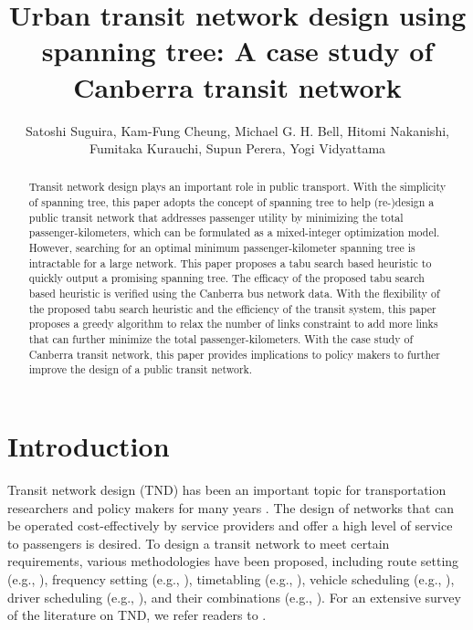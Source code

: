 \documentclass[10pt,english]{article}
\title{Urban transit network design using spanning tree: A case study of Canberra transit network}
\author{Satoshi Suguira, Kam-Fung Cheung, Michael G. H. Bell, Hitomi Nakanishi, \\ Fumitaka Kurauchi, Supun Perera, Yogi Vidyattama}
\date{}
\begin{document}
\maketitle

\begin{abstract}
Transit network design plays an important role in public transport. With
the simplicity of spanning tree, this paper adopts the concept of
spanning tree to help (re-)design a public transit network that
addresses passenger utility by minimizing the total
passenger-kilometers, which can be formulated as a mixed-integer
optimization model. However, searching for an optimal minimum
passenger-kilometer spanning tree is intractable for a large network.
This paper proposes a tabu search based heuristic to quickly output a
promising spanning tree. The efficacy of the proposed tabu search based
heuristic is verified using the Canberra bus network data. With the
flexibility of the proposed tabu search heuristic and the efficiency of
the transit system, this paper proposes a greedy algorithm to relax the
number of links constraint to add more links that can further minimize
the total passenger-kilometers. With the case study of Canberra transit
network, this paper provides implications to policy makers to further
improve the design of a public transit network.

\end{abstract}


\section{Introduction}
Transit network design (TND) has been an important topic for
transportation researchers and policy makers for many years
\citet{IbarraRojas2015}. The design of networks that can be operated
cost-effectively by service providers and offer a high level of service
to passengers is desired. To design a transit network to meet certain
requirements, various methodologies have been proposed, including route
setting (e.g., \citet{Mandl1980, Murray2003, Yang2007}),
frequency setting (e.g., \citet{Furth1981, Hadas2012, Verbas2015}), timetabling (e.g., \citet{dePalma2001, Gkiotsalitis2019, Gong2021, Guihaire2010, Huang2023, Li2010, Xie2021}), vehicle scheduling (e.g., \citep{Haghani2002, Kliewer2006, Kulkarni2018, Xi2020, Zhang2021}), driver scheduling (e.g., \citep{Smith1988, Toth2013, Oztop2017}), and their combinations (e.g., \citep{AndradeMichel2021, Baaj1995, Carosi2019, Szeto2011, Sun2019, vanNes1988, Zhen2020}). For an extensive survey of the literature on TND, we refer readers to \citep{Cipriani2012, Guihaire2008, Kepaptsoglou2009, IbarraRojas2015}.
\end{document}
